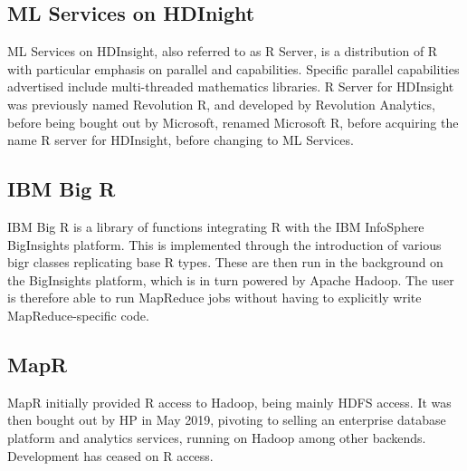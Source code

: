 \hypertarget{sec:r-server-hdinsight}{%
    \subsection{ML Services on HDInight}\label{sec:r-server-hdinsight}}

ML Services on HDInsight, also referred to as R Server, is a
distribution of R with particular emphasis on parallel and
capabilities\cite{azure16:_r_server_hdins_r_analy}. Specific
parallel capabilities advertised include multi-threaded mathematics
libraries. R Server for HDInsight was previously named Revolution R, and
developed by Revolution Analytics, before being bought out by Microsoft,
renamed Microsoft R, before acquiring the name R server for HDInsight,
before changing to ML Services.

\hypertarget{sec:ibm-big-r}{%
    \subsection{IBM Big R}\label{sec:ibm-big-r}}

IBM Big R is a library of functions integrating R with the IBM
InfoSphere BigInsights platform\cite{inc.14:_infos_bigin_big_r}.
This is implemented through the introduction of various bigr classes
replicating base R types. These are then run in the background on the
BigInsights platform, which is in turn powered by Apache Hadoop. The
user is therefore able to run MapReduce jobs without having to
explicitly write MapReduce-specific code.

\hypertarget{sec:mapr}{%
    \subsection{MapR}\label{sec:mapr}}

MapR initially provided R access to Hadoop, being mainly HDFS
access\cite{mapr19:_indus_next_gener_data_platf_ai_analy}. It was
then bought out by HP in May 2019, pivoting to selling an enterprise
database platform and analytics services, running on Hadoop among other
backends. Development has ceased on R access.
